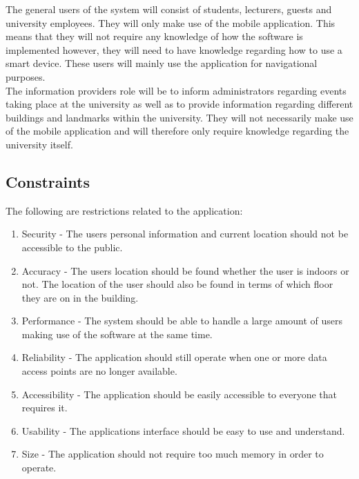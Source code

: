 \documentclass[11pt, a4paper]{article}
\begin{document}
	The general users of the system will consist of students,  lecturers,  guests and university employees. They will only make use of the mobile application. This means that they will not require any knowledge of how the software is implemented however,  they will need to have knowledge regarding how to use a smart device. These users will mainly use the application for navigational purposes.
	\\

	The information providers role will be to inform administrators regarding events taking place at the university as well as to provide information regarding different buildings and landmarks within the university. They will not necessarily make use of the mobile application and will therefore only require knowledge regarding the university itself.

	\subsection{Constraints}
	The following are restrictions related to the application:
		\begin{enumerate}
				\renewcommand{\labelenumi}{{\textbf{\arabic{enumi}.}}}
				\item Security  - The users personal information and current location should not be accessible to the public.
				\item Accuracy - The users location should be found whether the user is indoors or not. The location of the user should also be found in terms of which floor they are on in the building.
				\item Performance - The system should be able to handle a large amount of users making use of the software at the same time.
				\item Reliability - The application should still operate when one or more data access points are no longer available.
				\item Accessibility - The application should be easily accessible to everyone that requires it.
				\item Usability - The applications interface should be easy to use and understand.
				\item Size - The application should not require too much memory in order to operate.
				\end{enumerate}
\end{document}
